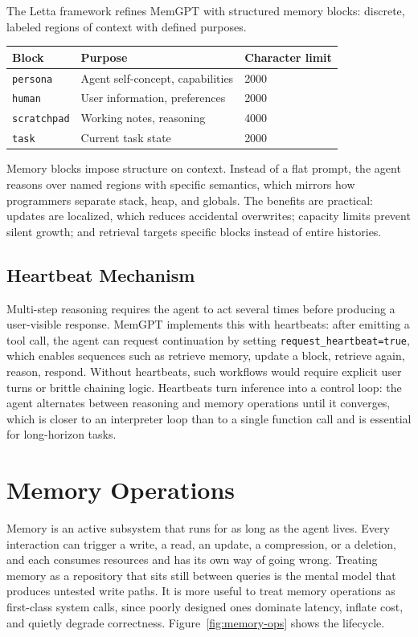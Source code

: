 \documentclass[11pt]{book}
\begin{document}
The Letta framework \cite{letta2024memgpt} refines MemGPT with structured memory blocks: discrete, labeled regions of context with defined purposes.

\begin{center}
\begin{tabular}{lll}
\toprule
Block & Purpose & Character limit \\
\midrule
\texttt{persona} & Agent self-concept, capabilities & 2000 \\
\texttt{human} & User information, preferences & 2000 \\
\texttt{scratchpad} & Working notes, reasoning & 4000 \\
\texttt{task} & Current task state & 2000 \\
\bottomrule
\end{tabular}
\end{center}

Memory blocks impose structure on context. Instead of a flat prompt, the agent reasons over named regions with specific semantics, which mirrors how programmers separate stack, heap, and globals. The benefits are practical: updates are localized, which reduces accidental overwrites; capacity limits prevent silent growth; and retrieval targets specific blocks instead of entire histories.

\subsection{Heartbeat Mechanism}

Multi-step reasoning requires the agent to act several times before producing a user-visible response. MemGPT implements this with heartbeats: after emitting a tool call, the agent can request continuation by setting \texttt{request\_heartbeat=true}, which enables sequences such as retrieve memory, update a block, retrieve again, reason, respond. Without heartbeats, such workflows would require explicit user turns or brittle chaining logic. Heartbeats turn inference into a control loop: the agent alternates between reasoning and memory operations until it converges, which is closer to an interpreter loop than to a single function call and is essential for long-horizon tasks.

\section{Memory Operations}

Memory is an active subsystem that runs for as long as the agent lives. Every interaction can trigger a write, a read, an update, a compression, or a deletion, and each consumes resources and has its own way of going wrong. Treating memory as a repository that sits still between queries is the mental model that produces untested write paths. It is more useful to treat memory operations as first-class system calls, since poorly designed ones dominate latency, inflate cost, and quietly degrade correctness. Figure~\ref{fig:memory-ops} shows the lifecycle.
\end{document}
